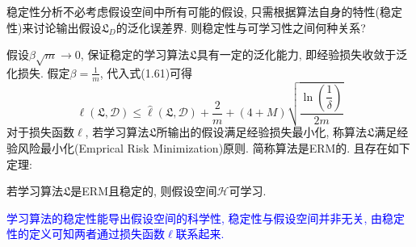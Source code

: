 稳定性分析不必考虑假设空间中所有可能的假设, 只需根据算法自身的特性(稳定性)来讨论输出假设$\mathfrak{L}_D$的泛化误差界. 则稳定性与可学习性之间何种关系?
\par
假设$\beta \sqrt{m}\rightarrow 0$, 保证稳定的学习算法$\mathfrak{L}$具有一定的泛化能力, 即经验损失收敛于泛化损失. 假定$\beta =\frac{1}{m}$, 代入式(1.61)可得
\begin{equation}
\ell \left( \mathfrak{L},\mathcal{D} \right) \le \hat{\ell}\left( \mathfrak{L},\mathcal{D} \right) +\frac{2}{m}+\left( 4+M \right) \sqrt{\frac{\ln \left( \dfrac{1}{\delta} \right)}{2m}}
\end{equation}
对于损失函数$\ell$, 若学习算法$\mathfrak{L}$所输出的假设满足经验损失最小化, 称算法$\mathfrak{L}$满足经验风险最小化(Emprical Risk Minimization)原则. 简称算法是ERM的. 且存在如下定理: 

\begin{theorem}\label{thm:9}
 若学习算法$\mathfrak{L}$是ERM且稳定的, 则假设空间$\mathcal{H}$可学习. 
 \end{theorem}
 
 \textcolor{blue}{ 学习算法的稳定性能导出假设空间的科学性, 稳定性与假设空间并非无关, 由稳定性的定义可知两者通过损失函数$\ell$联系起来. }
 
